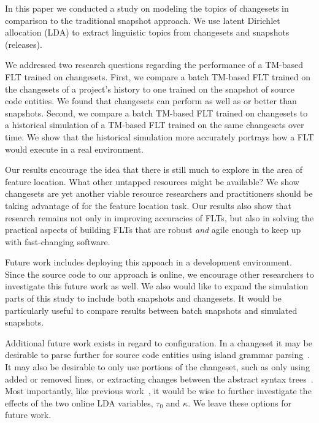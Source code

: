 
In this paper we conducted a study on modeling the topics of changesets in
comparison to the traditional snapshot approach.  We use latent Dirichlet
allocation (LDA) to extract linguistic topics from changesets and snapshots
(releases).

We addressed two research questions regarding the performance of a TM-based FLT
trained on changesets.  First, we compare a batch TM-based FLT trained on the
changesets of a project's history to one trained on the snapshot of source code
entities.  We found that changesets can perform as well as or better than
snapshots.  Second, we compare a batch TM-based FLT trained on changesets to
a historical simulation of a TM-based FLT trained on the same changesets over
time.  We show that the historical simulation more accurately portrays how a FLT
would execute in a real environment.

Our results encourage the idea that there is still much to explore in the area
of feature location. What other untapped resources might be available? We show
changesets are yet another viable resource researchers and practitioners should
be taking advantage of for the feature location task.  Our results also show
that research remains not only in improving accuracies of FLTs, but also in
solving the practical aspects of building FLTs that are robust \emph{and} agile
enough to keep up with fast-changing software.

Future work includes deploying this appoach in a development environment.  Since
the source code to our approach is online, we encourage other researchers to
investigate this future work as well.  We also would like to expand the simulation 
parts of this study to include both snapshots and changesets.  It would be
particularly useful to compare results between batch snapshots and simulated
snapshots. 

Additional future work exists in regard to configuration. In a changeset
it may be desirable to parse further for source code entities using
island grammar parsing~\cite{Moonen:2001}.  It may also be desirable to
only use portions of the changeset, such as only using added or removed
lines, or extracting changes between the abstract syntax
trees~\cite{Fluri-etal:2007}. Most importantly, like previous
work~\cite{Biggers-etal:2014}, it would be wise to further investigate
the effects of the two online LDA variables, $\tau_0$ and $\kappa$.  We
leave these options for future work.

